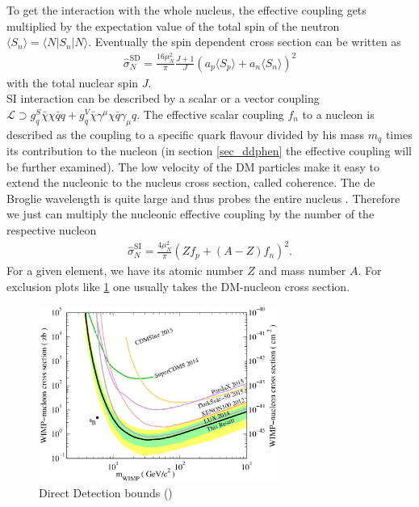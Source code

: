 To get the interaction with the whole nucleus, the effective coupling gets multiplied by the expectation value of the total spin of the neutron
$\langle S_n\rangle = \langle N|S_n|N\rangle$. Eventually the spin dependent cross section can be written as
\begin{align}
 \hat\sigma_N^\text{SD} = \frac{16\mu_N^2}{\pi} \frac{J+1}{J}\left(a_p \langle S_p\rangle + a_n \langle S_n \rangle\right)^2
 \label{eq_SDsigma}
\end{align}
with the total nuclear spin $J$.\\
\noindent SI interaction can be described by a scalar or a vector coupling 
$\mathcal{L} \supset g_q^S \bar \chi \chi \bar q q + g_q^V \bar \chi \gamma^\mu \chi \bar q \gamma_\mu q$. The effective scalar coupling $f_n$
to a nucleon is described as the coupling to a specific quark flavour divided by his mass $m_q$ times its contribution to the nucleon (in section
\ref{sec_ddphen} the effective coupling will be further examined). The low velocity of the DM particles make it easy to extend the nucleonic to the 
nucleus cross section, called coherence. The de Broglie wavelength is quite large and thus probes the entire nucleus \cite{tanedo}. Therefore
we just can multiply the nucleonic effective coupling by the number of the respective nucleon
\begin{align}
 \hat\sigma_N^\text{SI} = \frac{4\mu_N^2}{\pi} \left(Z f_p + (A-Z) f_n\right)^2.
 \label{eq_th.sigma.dd}
\end{align}
For a given element, we have its atomic number $Z$ and mass number $A$. For exclusion plots like \ref{pic_ddbounds} one usually takes the 
DM-nucleon cross section. 
\begin{figure}[t]
 \includegraphics[width=0.7\textwidth]{../pics/ddLux.jpeg}
 \caption{Direct Detection bounds (\cite{1512.03506})}
 \label{pic_ddbounds}
\end{figure}
